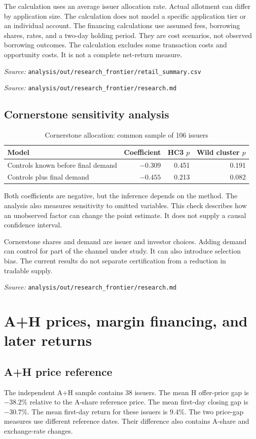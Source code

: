 \documentclass[11pt,a4paper]{article}
\newcommand{\src}[1]{\par{\footnotesize\textit{Source:} \nolinkurl{#1}}}
\begin{document}
The calculation uses an average issuer allocation rate.
Actual allotment can differ by application size.
The calculation does not model a specific application tier or an individual account.
The financing calculations use assumed fees, borrowing shares, rates, and a two-day holding period.
They are cost scenarios, not observed borrowing outcomes.
The calculation excludes some transaction costs and opportunity costs.
It is not a complete net-return measure.
\src{analysis/out/research_frontier/retail_summary.csv}
\src{analysis/out/research_frontier/research.md}

\subsection{Cornerstone sensitivity analysis}
\begin{table}[h]
\centering
\caption{Cornerstone allocation: common sample of 106 issuers}
\begin{tabular}{lrrr}
\toprule
Model & Coefficient & HC3 $p$ & Wild cluster $p$\\
\midrule
Controls known before final demand & $-0.309$ & 0.451 & 0.191\\
Controls plus final demand & $-0.455$ & 0.213 & 0.082\\
\bottomrule
\end{tabular}
\end{table}

Both coefficients are negative, but the inference depends on the method.
The analysis also measures sensitivity to omitted variables.
This check describes how an unobserved factor can change the point estimate.
It does not supply a causal confidence interval.

Cornerstone shares and demand are issuer and investor choices.
Adding demand can control for part of the channel under study.
It can also introduce selection bias.
The current results do not separate certification from a reduction in tradable supply.
\src{analysis/out/research_frontier/research.md}

\newpage
\section{A+H prices, margin financing, and later returns}
\subsection{A+H price reference}
The independent A+H sample contains 38 issuers.
The mean H offer-price gap is $-38.2\%$ relative to the A-share reference price.
The mean first-day closing gap is $-30.7\%$.
The mean first-day return for these issuers is 9.4\%.
The two price-gap measures use different reference dates.
Their difference also contains A-share and exchange-rate changes.
\end{document}
